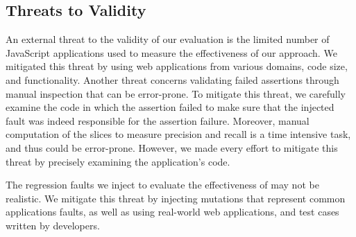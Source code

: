 \subsection{Threats to Validity} \label{Sec:threatsToValidity}
An external threat to the validity of our evaluation is the limited number of JavaScr\-ipt applications used to measure the effectiveness of our approach. We mitigated this threat by using web applications from various domains, code size, and functionality. Another threat concerns validating failed assertions through manual inspection that can be error-prone. To mitigate this threat, we carefully examine the code in which the assertion failed to make sure that the injected fault was indeed responsible for the assertion failure. Moreover, manual computation of the \javascript slices to measure precision and recall is a time intensive task, and thus could be error-prone. However, we made every effort to mitigate this threat by precisely examining the application's code.

The regression faults we inject to evaluate the effectiveness of \atrina may not be realistic. We mitigate this threat by injecting mutations that represent common \javascript applications faults, as well as using real-world web applications, and \selenium test cases written by developers.